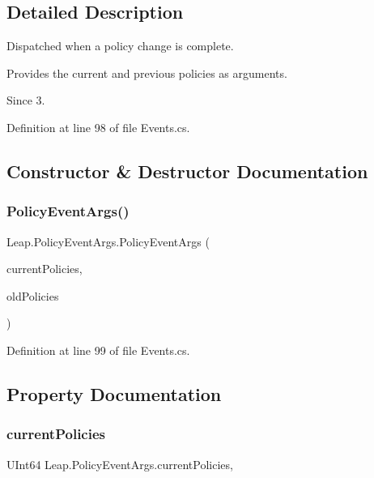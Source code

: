 \subsection{Detailed Description}
Dispatched when a policy change is complete. 

Provides the current and previous policies as arguments.

\begin{DoxySince}{Since}
3. 
\end{DoxySince}


Definition at line 98 of file Events.\+cs.



\subsection{Constructor \& Destructor Documentation}
\mbox{\label{class_leap_1_1_policy_event_args_a89b959aba17fa53af3df25a37a2bdab8}} 
\subsubsection{\texorpdfstring{PolicyEventArgs()}{PolicyEventArgs()}}
{\footnotesize\ttfamily Leap.\+Policy\+Event\+Args.\+Policy\+Event\+Args (\begin{DoxyParamCaption}\item[{U\+Int64}]{current\+Policies,  }\item[{U\+Int64}]{old\+Policies }\end{DoxyParamCaption})}



Definition at line 99 of file Events.\+cs.



\subsection{Property Documentation}
\mbox{\label{class_leap_1_1_policy_event_args_add9ddda6113e7f8fd96b0961cac32815}} 
\subsubsection{\texorpdfstring{currentPolicies}{currentPolicies}}
{\footnotesize\ttfamily U\+Int64 Leap.\+Policy\+Event\+Args.\+current\+Policies\hspace{0.3cm}{\ttfamily [get]}, {\ttfamily [set]}}



